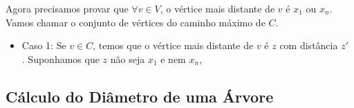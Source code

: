 \documentclass[a4paper,12pt]{article}
\begin{document}
        Agora precisamos provar que $\forall v \in V$, o vértice mais distante
        de $v$ é $x_1$ ou $x_n$.
        Vamos chamar o conjunto de vértices do caminho máximo de $C$.
        \begin{itemize}
            \item Caso 1: Se $v \in C$, temos que o vértice mais distante de $v$ é $z$ com 
            distância $z'$ . Suponhamos que $z$ não seja $x_1$ e nem $x_n$, 

        \end{itemize}
        
    \subsection{Cálculo do Diâmetro de uma Árvore}
    
        
                                
    


\newpage
    
    
    
\end{document}
